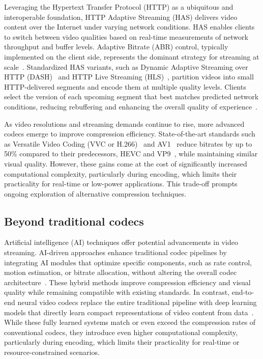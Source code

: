 \documentclass[manuscript, screen]{acmart}
\begin{document}
Leveraging the Hypertext Transfer Protocol (HTTP) as a ubiquitous and interoperable foundation, HTTP Adaptive Streaming (HAS) delivers video content over the Internet under varying network conditions. HAS enables clients to switch between video qualities based on real-time measurements of network throughput and buffer levels. Adaptive Bitrate (ABR) control, typically implemented on the client side, represents the dominant strategy for streaming at scale~\cite{sani2017abr}. Standardized HAS variants, such as Dynamic Adaptive Streaming over HTTP (DASH)~\cite{Stockhammer2011} and HTTP Live Streaming (HLS)~\cite{AppleHLS}, partition videos into small HTTP-delivered segments and encode them at multiple quality levels. Clients select the version of each upcoming segment that best matches predicted network conditions, reducing rebuffering and enhancing the overall quality of experience~\cite{QoEWhitePaper}.

As video resolutions and streaming demands continue to rise, more advanced codecs emerge to improve compression efficiency. State-of-the-art standards such as Versatile Video Coding (VVC or H.266)~\cite{vvc_overview} and AV1~\cite{av1_overview} reduce bitrates by up to 50\% compared to their predecessors, HEVC and VP9~\cite{vp9_overview}, while maintaining similar visual quality. However, these gains come at the cost of significantly increased computational complexity, particularly during encoding, which limits their practicality for real-time or low-power applications. This trade-off prompts ongoing exploration of alternative compression techniques.

\subsection{Beyond traditional codecs}


Artificial intelligence (AI) techniques offer potential advancements in video streaming. AI-driven approaches enhance traditional codec pipelines by integrating AI modules that optimize specific components, such as rate control, motion estimation, or bitrate allocation, without altering the overall codec architecture~\cite{liu2020deep, lu2019dvc}. These hybrid methods improve compression efficiency and visual quality while remaining compatible with existing standards. In contrast, end-to-end neural video codecs replace the entire traditional pipeline with deep learning models that directly learn compact representations of video content from data~\cite{lu2019dvc, chen2021nerv}. While these fully learned systems match or even exceed the compression rates of conventional codecs, they introduce even higher computational complexity, particularly during encoding, which limits their practicality for real-time or resource-constrained scenarios.
\end{document}
